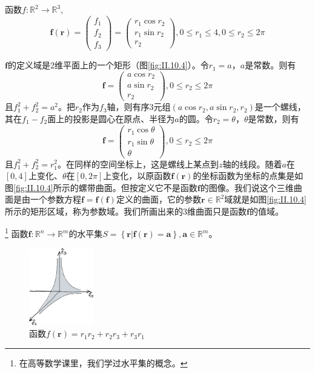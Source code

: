 \documentclass[main.tex]{subfiles}
\begin{document}
\begin{example}
函数$f:\mathbb{R}^2\rightarrow\mathbb{R}^3,$
\[
\mathbf{f}\left(\mathbf{r}\right)=\left(\begin{array}{c}f_1\\f_2\\f_3\end{array}\right)=\left(\begin{array}{c}r_1\cos r_2\\r_1\sin r_2\\r_2\end{array}\right),0\leq r_1\leq 4,0\leq r_2\leq 2\pi
\]

$\mathbf{f}$的定义域是2维平面上的一个矩形（图\ref{fig:II.10.4}）。令$r_1=a$，$a$是常数。则有
\[
\mathbf{f}=\left(\begin{array}{c}
    a\cos r_2\\
    a\sin r_2\\
    r_2
    \end{array}\right),0\leq r_2\leq 2\pi
\]
且$f_1^2+f_2^2=a^2$。把$r_2$作为$f_3$轴，则有序3元组$\left(a\cos r_2,a\sin r_2,r_2\right)$是一个螺线，其在$f_1-f_2$面上的投影是圆心在原点、半径为$a$的圆。令$r_2=\theta$，$\theta$是常数，则有
\[
\mathbf{f}=\left(\begin{array}{c}
    r_1\cos \theta\\
    r_1\sin \theta\\
    \theta
    \end{array}\right),0\leq r_2\leq 2\pi
\]
且$f_1^2+f_2^2=r_1^2$。在同样的空间坐标上，这是螺线上某点到$z$轴的线段。随着$a$在$\left[0,4\right]$上变化、$\theta$在$\left[0,2\pi\right]$上变化，以原函数$\mathbf{f}\left(\mathbf{r}\right)$的坐标函数为坐标的点集是如图\ref{fig:II.10.4}所示的螺带曲面。但按定义它不是函数$\mathbf{f}$的图像。我们说这个三维曲面是由一个参数方程$\mathbf{f}=\mathbf{f}\left(\mathbf{f}\right)$定义的曲面，它的参数$\mathbf{r}\in\mathbb{R}^2$域就是如图\ref{fig:II.10.4}所示的矩形区域，称为参数域。我们所画出来的3维曲面只是函数$\mathbf{f}$的值域。
\end{example}

\begin{definition}[函数的水平集]\footnote{在高等数学课里，我们学过水平集的概念\cite[\S7.1,p~1] {华工高数2009下}。}
函数$\mathbf{f}:\mathbb{R}^n\rightarrow\mathbb{R}^m$的水平集$S=\left\{\mathbf{r}|\mathbf{f}\left(\mathbf{r}\right)=\mathbf{a}\right\},\mathbf{a}\in\mathbb{R}^m$。
\end{definition}

\begin{figure}[h]
    \centering
    \includegraphics[width=0.25\textwidth]{images/II.10.5.eps}
    \caption{函数$f\left(\mathbf{r}\right)=r_1r_2+r_2r_3+r_3r_1$}
    \label{fig:II.10.5}
\end{figure}
\end{document}
